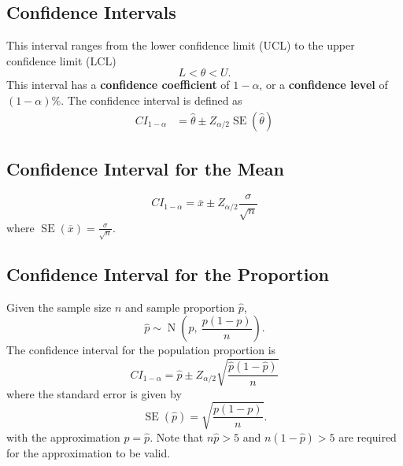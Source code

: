 \documentclass{article}
\begin{document}
\begin{multicols}{3}
\subsection{Confidence Intervals}
This interval ranges from the lower confidence limit (UCL) to the upper confidence limit (LCL)
\begin{equation*}
    L < \theta < U.
\end{equation*}
This interval has a \textbf{confidence coefficient} of \(1 - \alpha\), or a \textbf{confidence level} of \(\left( 1 - \alpha \right)\%\).
The confidence interval is defined as
\begin{align*}
    {CI}_{1 - \alpha} &= \hat{\theta} \pm Z_{\alpha / 2} \operatorname{SE}\left( \hat{\theta} \right)
\end{align*}
\subsection{Confidence Interval for the Mean}
\begin{equation*}
    {CI}_{1-\alpha} = \overline{x} \pm Z_{\alpha/2} \frac{\sigma}{\sqrt{n}}
\end{equation*}
where
\(
    \operatorname{SE}\left( \overline{x} \right) = \frac{\sigma}{\sqrt{n}}.
    \)
\subsection{Confidence Interval for the Proportion}
Given the sample size \(n\) and sample proportion \(\hat{p}\),
\begin{equation*}
    \hat{p} \sim \operatorname{N}\left( p,\: \frac{p\left( 1 - p \right)}{n} \right).
\end{equation*}
The confidence interval for the population proportion is
\begin{equation*}
    {CI}_{1-\alpha} = \hat{p} \pm Z_{\alpha/2} \sqrt{\frac{\hat{p}\left( 1 - \hat{p} \right)}{n}}
\end{equation*}
where the standard error is given by
\begin{equation*}
    \operatorname{SE}\left( \hat{p} \right) = \sqrt{\frac{p\left( 1 - p \right)}{n}}.
\end{equation*}
with the approximation \(p=\hat{p}\).
Note that \(n \hat{p} > 5\) and \(n \left( 1 - \hat{p} \right) > 5\) are required for the approximation to be valid.

\end{multicols}
\end{document}

